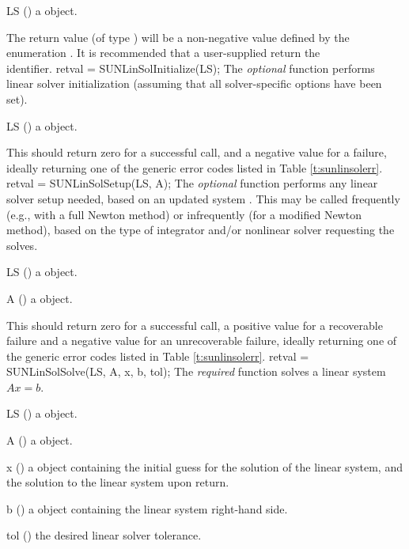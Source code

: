 {
  \begin{args}[LS]
  \item[LS] ()
    a {\sunlinsol} object.
  \end{args}
}
{
  The return value  (of type ) will be a non-negative value
  defined by the enumeration .
}
{
  It is recommended that a user-supplied  return the\\
  \noindent {} identifier.
}
{
  retval = SUNLinSolInitialize(LS);
}
{
  The \textit{optional} function  performs
  linear solver initialization (assuming that all solver-specific
  options have been set).
}
{
  \begin{args}[LS]
  \item[LS] ()
    a {\sunlinsol} object.
  \end{args}
}
{
  This should return zero for a
  successful call, and a negative value for a failure, ideally
  returning one of the generic error codes listed in Table
  \ref{t:sunlinsolerr}.
}
{}
{
  retval = SUNLinSolSetup(LS, A);
}
{
  The \textit{optional} function  performs
  any linear solver setup needed, based on an updated system
  {\sunmatrix} .  This may be called frequently (e.g., with a full
  Newton method) or infrequently (for a modified Newton method), based
  on the type of integrator and/or nonlinear solver requesting the
  solves.
}
{
  \begin{args}[LS]
  \item[LS] ()
    a {\sunlinsol} object.
  \item[A] ()
    a {\sunmatrix} object.
  \end{args}
}
{
  This should return zero for a successful call, a positive
  value for a recoverable failure and a negative value for an
  unrecoverable failure, ideally returning one of the generic error
  codes listed in Table \ref{t:sunlinsolerr}.
}
{}
{
  retval = SUNLinSolSolve(LS, A, x, b, tol);
}
{
  The \textit{required} function  solves a linear system $Ax = b$.
}
{
  \begin{args}[tol]
  \item[LS] ()
    a {\sunlinsol} object.
  \item[A] ()
    a {\sunmatrix} object.
  \item[x] ()
    a {\nvector} object containing the initial guess for the solution of the
    linear system, and the solution to the linear system upon return.
  \item[b] ()
    a {\nvector} object containing the linear system right-hand side.
  \item[tol] ()
    the desired linear solver tolerance.
  \end{args}
}
